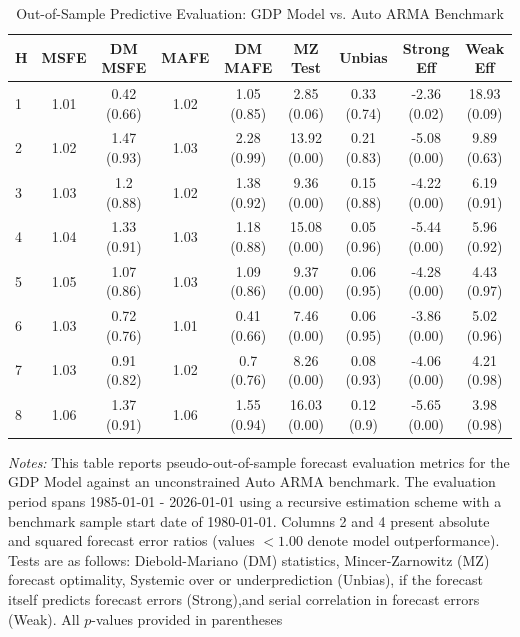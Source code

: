 \begin{table}[htbp]
\centering
\caption{Out-of-Sample Predictive Evaluation: GDP Model vs. Auto ARMA Benchmark}
\label{tab:gdp_model_evaluation}
\footnotesize
\begin{tabular}{l cccccccc}
\hline\hline
\rule{0pt}{3ex}
\textbf{H} & \textbf{MSFE} & \textbf{DM MSFE} & \textbf{MAFE} & \textbf{DM MAFE} & \textbf{MZ Test} & \textbf{Unbias} & \textbf{Strong Eff} & \textbf{Weak Eff} \\[0.5ex]
\hline
\rule{0pt}{2.5ex}
1 & 1.01 & 0.42 (0.66) & 1.02 & 1.05 (0.85) & 2.85 (0.06) & 0.33 (0.74) & -2.36 (0.02) & 18.93 (0.09) \\
2 & 1.02 & 1.47 (0.93) & 1.03 & 2.28 (0.99) & 13.92 (0.00) & 0.21 (0.83) & -5.08 (0.00) & 9.89 (0.63) \\
3 & 1.03 & 1.2 (0.88) & 1.02 & 1.38 (0.92) & 9.36 (0.00) & 0.15 (0.88) & -4.22 (0.00) & 6.19 (0.91) \\
4 & 1.04 & 1.33 (0.91) & 1.03 & 1.18 (0.88) & 15.08 (0.00) & 0.05 (0.96) & -5.44 (0.00) & 5.96 (0.92) \\
5 & 1.05 & 1.07 (0.86) & 1.03 & 1.09 (0.86) & 9.37 (0.00) & 0.06 (0.95) & -4.28 (0.00) & 4.43 (0.97) \\
6 & 1.03 & 0.72 (0.76) & 1.01 & 0.41 (0.66) & 7.46 (0.00) & 0.06 (0.95) & -3.86 (0.00) & 5.02 (0.96) \\
7 & 1.03 & 0.91 (0.82) & 1.02 & 0.7 (0.76) & 8.26 (0.00) & 0.08 (0.93) & -4.06 (0.00) & 4.21 (0.98) \\
8 & 1.06 & 1.37 (0.91) & 1.06 & 1.55 (0.94) & 16.03 (0.00) & 0.12 (0.9) & -5.65 (0.00) & 3.98 (0.98) \\
\hline\hline
\end{tabular}%
\par\smallskip
\parbox{\textwidth}{\scriptsize \textit{Notes:} This table reports pseudo-out-of-sample forecast evaluation metrics for the GDP Model against an unconstrained Auto ARMA benchmark. The evaluation period spans 1985-01-01 - 2026-01-01 using a recursive estimation scheme with a benchmark sample start date of 1980-01-01. Columns 2 and 4 present absolute and squared forecast error ratios (values $< 1.00$ denote model outperformance). Tests are as follows: Diebold-Mariano (DM) statistics, Mincer-Zarnowitz (MZ) forecast optimality, Systemic over or underprediction (Unbias), if the forecast itself predicts forecast errors (Strong),and serial correlation in forecast errors (Weak). All $p$-values provided in parentheses}
\end{table}
